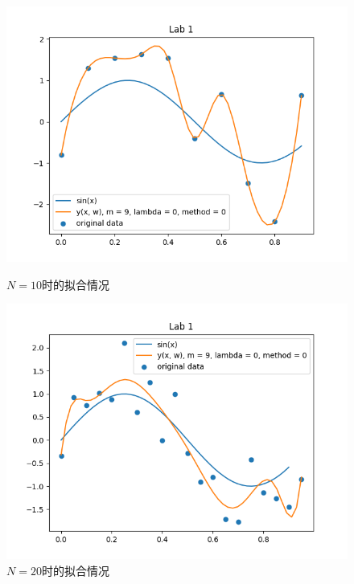 \begin{figure}[htbp]
    \begin{minipage}[t]{0.5\linewidth}
        \centering
        \includegraphics[width=\textwidth]{figures/Figure_5.png}
        \caption{$N = 10$时的拟合情况}
        \label{N10}
    \end{minipage}
    \begin{minipage}[t]{0.5\linewidth}
        \centering
        \includegraphics[width=\textwidth]{figures/Figure_6.png}
        \caption{$N = 20$时的拟合情况}
        \label{N20}
    \end{minipage}
\end{figure}

